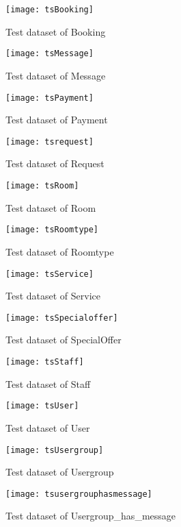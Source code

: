         \begin{center}
          \begin{figure}
            \texttt{[image: tsBooking]}
            \caption{Test dataset of Booking}
          \end{figure}
          \begin{figure}
            \texttt{[image: tsMessage]}
            \caption{Test dataset of Message}
          \end{figure}
          \begin{figure}
            \texttt{[image: tsPayment]}
            \caption{Test dataset of Payment}
          \end{figure}
          \begin{figure}
            \texttt{[image: tsrequest]}
            \caption{Test dataset of Request}
          \end{figure}
          \begin{figure}
            \texttt{[image: tsRoom]}
            \caption{Test dataset of Room}
          \end{figure}
          \begin{figure}
            \texttt{[image: tsRoomtype]}
            \caption{Test dataset of Roomtype}
          \end{figure}
          \begin{figure}
            \texttt{[image: tsService]}
            \caption{Test dataset of Service}
          \end{figure}
          \begin{figure}
            \texttt{[image: tsSpecialoffer]}
            \caption{Test dataset of SpecialOffer}
          \end{figure}
          \begin{figure}
            \texttt{[image: tsStaff]}
            \caption{Test dataset of Staff}
          \end{figure}
          \begin{figure}
            \texttt{[image: tsUser]}
            \caption{Test dataset of User}
          \end{figure}
          \begin{figure}
            \texttt{[image: tsUsergroup]}
            \caption{Test dataset of Usergroup}
          \end{figure}
          \begin{figure}
            \texttt{[image: tsusergrouphasmessage]}
            \caption{Test dataset of Usergroup\_has\_message}
          \end{figure}

        \end{center}
        \newpage


